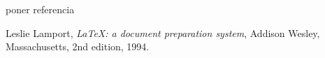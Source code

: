 \renewcommand{\bibname}{Bibliografía}             %
 \renewcommand{\refname}{Bibliografía}             %
 
\begin{thebibliography}{9}

  poner referencia %
  
  Leslie Lamport,
  \emph{\LaTeX: a document preparation system},
  Addison Wesley, Massachusetts,
  2nd edition,
  1994.
  
  

\end{thebibliography}